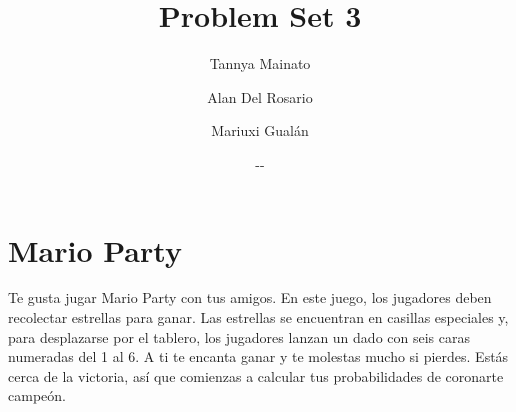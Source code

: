 \documentclass[a4paper]{article}
\title{Problem Set 3}
\author{Tannya Mainato \and Alan Del Rosario \and Mariuxi Gualán}
\date{\the\year-\twodigit\month-\twodigit\day}
\begin{document}
\maketitle


\section*{Mario Party}

Te gusta jugar Mario Party con tus amigos. En este juego, los jugadores deben recolectar estrellas para ganar. Las estrellas se encuentran en casillas especiales y, para desplazarse por el tablero, los jugadores
lanzan un dado con seis caras numeradas del 1 al 6. A ti te encanta ganar y te molestas mucho si pierdes.
Estás cerca de la victoria, así que comienzas a calcular tus probabilidades de coronarte campeón.
\end{document}
